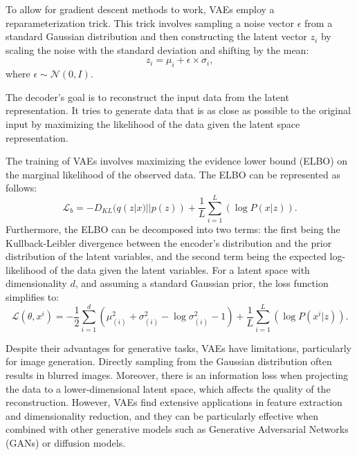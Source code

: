 \documentclass[11pt,a4paper,oneside]{report}
\begin{document}
To allow for gradient descent methods to work, VAEs employ a reparameterization trick. This trick involves sampling a noise vector $\epsilon$ from a standard Gaussian distribution and then constructing the latent vector $z_i$ by scaling the noise with the standard deviation and shifting by the mean:
\begin{equation}
z_i = \mu_i + \epsilon \times \sigma_i,
\end{equation}
where $\epsilon \sim \mathcal{N}(0, I)$.

The decoder's goal is to reconstruct the input data from the latent representation. It tries to generate data that is as close as possible to the original input by maximizing the likelihood of the data given the latent space representation.

The training of VAEs involves maximizing the evidence lower bound (ELBO) on the marginal likelihood of the observed data. The ELBO can be represented as follows:
\begin{equation}
\mathcal{L}_b = -D_{KL}(q(z|x)||p(z)) + \frac{1}{L} \sum_{i=1}^{L}(\log P(x|z)).
\end{equation}
Furthermore, the ELBO can be decomposed into two terms: the first being the Kullback-Leibler divergence between the encoder's distribution and the prior distribution of the latent variables, and the second term being the expected log-likelihood of the data given the latent variables. For a latent space with dimensionality $d$, and assuming a standard Gaussian prior, the loss function simplifies to:
\begin{equation}
\mathcal{L}(\theta, x^i) = -\frac{1}{2} \sum_{i=1}^{d} \left( \mu^{2}_{(i)} + \sigma^{2}_{(i)} - \log \sigma^{2}_{(i)} - 1 \right) + \frac{1}{L} \sum_{i=1}^{L} \left( \log P(x^{i} | z) \right).
\end{equation}

Despite their advantages for generative tasks, VAEs have limitations, particularly for image generation. Directly sampling from the Gaussian distribution often results in blurred images. Moreover, there is an information loss when projecting the data to a lower-dimensional latent space, which affects the quality of the reconstruction. However, VAEs find extensive applications in feature extraction and dimensionality reduction, and they can be particularly effective when combined with other generative models such as Generative Adversarial Networks (GANs) or diffusion models.
\end{document}
